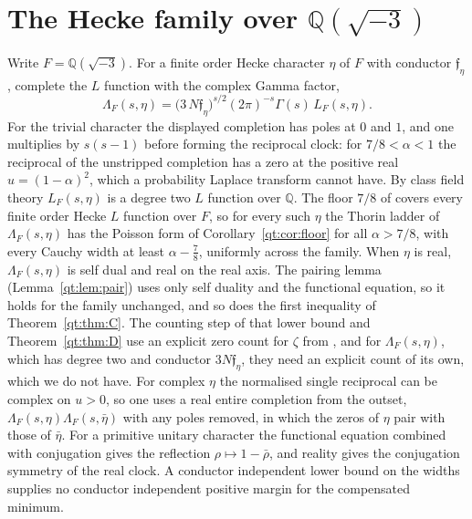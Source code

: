 \section{The Hecke family over $\mathbb Q(\sqrt{-3})$}\label{qt:sec:hecke}

Write $F=\mathbb Q(\sqrt{-3})$. For a finite order Hecke character $\eta$ of $F$ with conductor $\mathfrak f_\eta$, complete the $L$ function with the complex Gamma factor,
\[
\Lambda_F(s,\eta)=\big(3\,N\mathfrak f_\eta\big)^{s/2}(2\pi)^{-s}\Gamma(s)\,L_F(s,\eta).
\]
For the trivial character the displayed completion has poles at $0$ and $1$, and one multiplies by $s(s-1)$ before forming the reciprocal clock: for $7/8<\alpha<1$ the reciprocal of the unstripped completion has a zero at the positive real $u=(1-\alpha)^2$, which a probability Laplace transform cannot have. By class field theory $L_F(s,\eta)$ is a degree two $L$ function over $\mathbb Q$. The floor $7/8$ of \cite{OAI26a} covers every finite order Hecke $L$ function over $F$, so for every such $\eta$ the Thorin ladder of $\Lambda_F(s,\eta)$ has the Poisson form of Corollary~\ref{qt:cor:floor} for all $\alpha>7/8$, with every Cauchy width at least $\alpha-\frac78$, uniformly across the family. When $\eta$ is real, $\Lambda_F(s,\eta)$ is self dual and real on the real axis. The pairing lemma (Lemma~\ref{qt:lem:pair}) uses only self duality and the functional equation, so it holds for the family unchanged, and so does the first inequality of Theorem~\ref{qt:thm:C}. The counting step of that lower bound and Theorem~\ref{qt:thm:D} use an explicit zero count for $\zeta$ from \cite{HSW22}, and for $\Lambda_F(s,\eta)$, which has degree two and conductor $3N\mathfrak f_\eta$, they need an explicit count of its own, which we do not have. For complex $\eta$ the normalised single reciprocal can be complex on $u>0$, so one uses a real entire completion from the outset, $\Lambda_F(s,\eta)\Lambda_F(s,\bar\eta)$ with any poles removed, in which the zeros of $\eta$ pair with those of $\bar\eta$. For a primitive unitary character the functional equation combined with conjugation gives the reflection $\rho\mapsto1-\bar\rho$, and reality gives the conjugation symmetry of the real clock. A conductor independent lower bound on the widths supplies no conductor independent positive margin for the compensated minimum.

